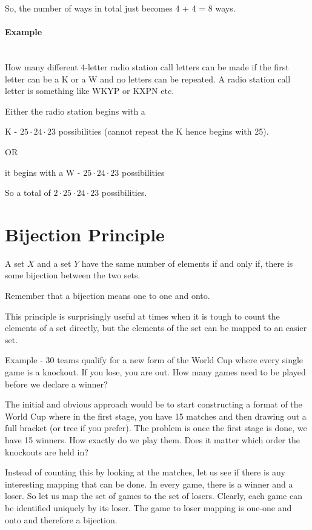 \documentclass[12pt]{article}
\begin{document}
So, the number of ways in total just becomes 4 + 4 = 8 ways.

\paragraph{Example}~\\ 

How many different 4-letter radio station call letters can be made if the first letter can be a K or a W and no letters can be repeated. A radio station call letter is something like WKYP or KXPN etc.

Either the radio station begins with a 

K - $25 \cdot 24 \cdot 23$ possibilities (cannot repeat the K hence begins with 25).

OR

it begins with a W - $25 \cdot 24 \cdot 23$ possibilities

So a total of $2 \cdot 25 \cdot 24 \cdot 23$ possibilities.

\section*{Bijection Principle}
A set $X$ and a set $Y$ have the same number of elements if and only if, there is some bijection between the two sets. 

Remember that a bijection means one to one and onto. 

This principle is surprisingly useful at times when it is tough to count the elements of a set directly, but the elements of the set can be mapped to an easier set. 

Example - 30 teams qualify for a new form of the World Cup where every single game is a knockout. If you lose, you are out. How many games need to be played before we declare a winner?

The initial and obvious approach would be to start constructing a format of the World Cup where in the first stage, you have 15 matches and then drawing out a full bracket (or tree if you prefer). The problem is once the first stage is done, we have 15 winners. How exactly do we play them. Does it matter which order the knockouts are held in?

Instead of counting this by looking at the matches, let us see if there is any interesting mapping that can be done. In every game, there is a winner and a loser. So let us map the set of games to the set of losers. Clearly, each game can be identified uniquely by its loser. The game to loser mapping is one-one and onto and therefore a bijection. 
\end{document}
